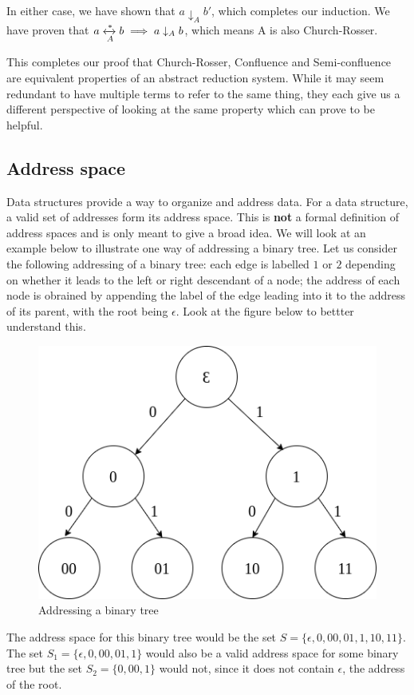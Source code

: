 In either case, we have shown that $a \downarrow _A b'$, which completes our induction. We have proven that $a \xleftrightarrow[A]{*} b \implies a \downarrow_A b$, which means A is also Church-Rosser.

This completes our proof that Church-Rosser, Confluence and Semi-confluence are equivalent properties of an abstract reduction system. While it may seem redundant to have multiple terms to refer to the same thing, they each give us a different perspective of looking at the same property which can prove to be helpful.


\subsection{Address space}
Data structures provide a way to organize and address data. For a data structure, a valid set of addresses form its address space. This is \textbf{not} a formal definition of address spaces and is only meant to give a broad idea. We will look at an example below to illustrate one way of addressing a binary tree. Let us consider the following addressing of a binary tree: each edge is labelled $1$ or $2$ depending on whether it leads to the left or right descendant of a node; the address of each node is obrained by appending the label of the edge leading into it to the address of its parent, with the root being $\epsilon$. Look at the figure below to bettter understand this.
\begin{figure}[htbp]
    \center
    \includegraphics[scale=0.4]{images/lecture1/address.png}
    \caption{Addressing a binary tree}
\end{figure}

The address space for this binary tree would be the set $S = \{\epsilon, 0, 00, 01, 1, 10, 11 \}$. The set $S_1 = \{ \epsilon, 0, 00, 01, 1 \}$ would also be a valid address space for some binary tree but the set $S_2 = \{ 0, 00, 1 \}$ would not, since it does not contain $\epsilon$, the address of the root.

